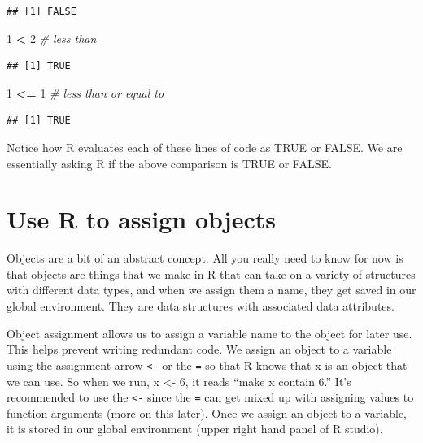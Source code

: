 \documentclass[
]{book}
\newenvironment{Shaded}{\begin{snugshade}}{\end{snugshade}}
\newcommand{\CommentTok}[1]{\textcolor[rgb]{0.56,0.35,0.01}{\textit{#1}}}
\newcommand{\DecValTok}[1]{\textcolor[rgb]{0.00,0.00,0.81}{#1}}
\newcommand{\SpecialCharTok}[1]{\textcolor[rgb]{0.81,0.36,0.00}{\textbf{#1}}}
\begin{document}
\begin{verbatim}
## [1] FALSE
\end{verbatim}

\begin{Shaded}
\begin{Highlighting}[]
\DecValTok{1} \SpecialCharTok{\textless{}} \DecValTok{2}  \CommentTok{\# less than}
\end{Highlighting}
\end{Shaded}

\begin{verbatim}
## [1] TRUE
\end{verbatim}

\begin{Shaded}
\begin{Highlighting}[]
\DecValTok{1} \SpecialCharTok{\textless{}=} \DecValTok{1}  \CommentTok{\# less than or equal to}
\end{Highlighting}
\end{Shaded}

\begin{verbatim}
## [1] TRUE
\end{verbatim}

Notice how R evaluates each of these lines of code as TRUE or FALSE. We are essentially asking R if the above comparison is TRUE or FALSE.

\section{Use R to assign objects}\label{use-r-to-assign-objects}

Objects are a bit of an abstract concept. All you really need to know for now is that objects are things that we make in R that can take on a variety of structures with different data types, and when we assign them a name, they get saved in our global environment. They are data structures with associated data attributes.

Object assignment allows us to assign a variable name to the object for later use. This helps prevent writing redundant code. We assign an object to a variable using the assignment arrow \texttt{\textless{}-} or the \texttt{=} so that R knows that x is an object that we can use. So when we run, x \textless- 6, it reads ``make x contain 6.'' It's recommended to use the \texttt{\textless{}-} since the \texttt{=} can get mixed up with assigning values to function arguments (more on this later). Once we assign an object to a variable, it is stored in our global environment (upper right hand panel of R studio).
\end{document}
